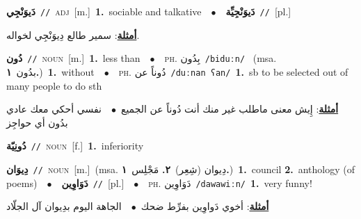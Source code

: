 \documentclass[10pt,a4paper,twoside]{article} %
\begin{document}
\begin{multicols}{2}
{\setlength\topsep{0pt}\textbf{\foreignlanguage{arabic}{دَيوَنْجِي}}\ {\color{gray}\texttt{//}\color{black}}\ \textsc{adj}\ [m.]\ \textbf{1.}~sociable and talkative\ \ $\bullet$\ \ \setlength\topsep{0pt}\textbf{\foreignlanguage{arabic}{دَيوَنْجِيِّة}}\ {\color{gray}\texttt{//}\color{black}}\ [pl.]\  \begin{flushright}\color{gray}\foreignlanguage{arabic}{\textbf{\underline{\foreignlanguage{arabic}{أمثلة}}}: سمير طالع دِيوَنْجِي لخواله.}\end{flushright}\color{black}} \vspace{2mm}

{\setlength\topsep{0pt}\textbf{\foreignlanguage{arabic}{دُون}}\ {\color{gray}\texttt{//}\color{black}}\ \textsc{noun}\ [m.]\ \textbf{1.}~less than\ \ $\bullet$\ \ \textsc{ph.} \color{gray} \foreignlanguage{arabic}{بِدُون}\color{black}\ {\color{gray}\texttt{/{\sffamily biduːn}/}\color{black}}\ \color{gray} (msa. \foreignlanguage{arabic}{بدُون}~\foreignlanguage{arabic}{\textbf{١.}})\color{black}\ \textbf{1.}~without\ \ $\bullet$\ \ \textsc{ph.} \color{gray} \foreignlanguage{arabic}{دُوناً عن}\color{black}\ {\color{gray}\texttt{/{\sffamily duːnan ʕan}/}\color{black}}\ \textbf{1.}~sb to be selected out of many people to do sth\  \begin{flushright}\color{gray}\foreignlanguage{arabic}{\textbf{\underline{\foreignlanguage{arabic}{أمثلة}}}: إِيش معنى ماطلب غير منك أنت دُوناً عن الجميع\ $\bullet$\ \  نفسي أحكي معك عادي بدُون أي حواجِز}\end{flushright}\color{black}} \vspace{2mm}

{\setlength\topsep{0pt}\textbf{\foreignlanguage{arabic}{دُونِيّة}}\ {\color{gray}\texttt{//}\color{black}}\ \textsc{noun}\ [f.]\ \textbf{1.}~inferiority\ } \vspace{2mm}

{\setlength\topsep{0pt}\textbf{\foreignlanguage{arabic}{دِيوَان}}\ {\color{gray}\texttt{//}\color{black}}\ \textsc{noun}\ [m.]\ \color{gray}(msa. \foreignlanguage{arabic}{دِيوان (شِعِر)}~\foreignlanguage{arabic}{\textbf{٢.}}  \foreignlanguage{arabic}{مَجْلِس}~\foreignlanguage{arabic}{\textbf{١.}})\color{black}\ \textbf{1.}~council  \textbf{2.}~anthology (of poems)\ \ $\bullet$\ \ \setlength\topsep{0pt}\textbf{\foreignlanguage{arabic}{دَوَاوِين}}\ {\color{gray}\texttt{//}\color{black}}\ [pl.]\ \ $\bullet$\ \ \textsc{ph.} \color{gray} \foreignlanguage{arabic}{دَوَاوِين}\color{black}\ {\color{gray}\texttt{/{\sffamily dawawiːn}/}\color{black}}\ \textbf{1.}~very funny!\  \begin{flushright}\color{gray}\foreignlanguage{arabic}{\textbf{\underline{\foreignlanguage{arabic}{أمثلة}}}: أخوي دَواوِين بفرِّط ضحك\ $\bullet$\ \  الجاهة اليوم بدِيوان آل الجلّاد}\end{flushright}\color{black}} \vspace{2mm}


\end{multicols}
\end{document}
